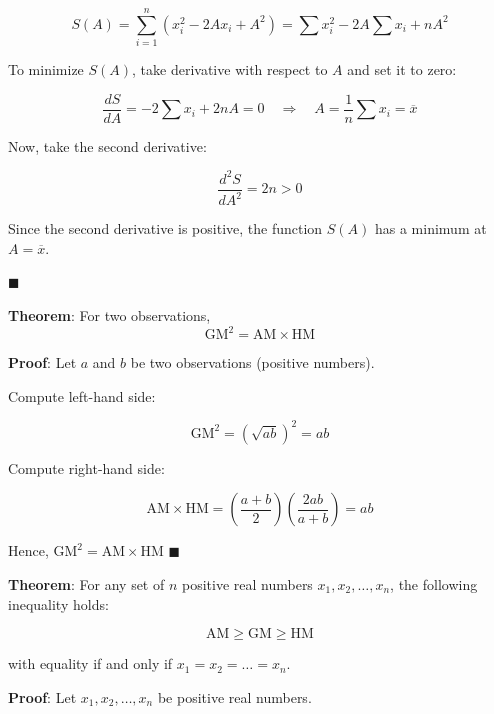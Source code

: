 \documentclass[twoside]{book}
\begin{document}
\[
S(A) = \sum_{i=1}^n (x_i^2 - 2Ax_i + A^2) 
= \sum x_i^2 - 2A\sum x_i + nA^2
\]

To minimize \( S(A) \), take derivative with respect to \( A \) and set it to zero:

\[
\frac{dS}{dA} = -2\sum x_i + 2nA = 0 \quad \Rightarrow \quad A = \frac{1}{n} \sum x_i = \overline{x}
\]

Now, take the second derivative:

\[
\frac{d^2S}{dA^2} = 2n > 0
\]

Since the second derivative is positive, the function \( S(A) \) has a minimum at \( A = \overline{x} \).

\hfill $\blacksquare$

\begin{textbox}
\textbf{Theorem}: For two observations, \[ \text{GM}^2 = \text{AM} \times \text{HM} \]
\end{textbox}

\textbf{Proof}: Let \( a \) and \( b \) be two observations (positive numbers).

Compute left-hand side:

\[
\text{GM}^2 = (\sqrt{ab})^2 = ab
\]

Compute right-hand side:

\[
\text{AM} \times \text{HM} = \left( \frac{a + b}{2} \right) \left( \frac{2ab}{a + b} \right) = ab
\]

Hence, \( \text{GM}^2 = \text{AM} \times \text{HM} \)
\hfill $\blacksquare$

\begin{textbox}
\textbf{Theorem}: For any set of \( n \) positive real numbers \( x_1, x_2, \dots, x_n \), the following inequality holds:

\[
\text{AM} \geq \text{GM} \geq \text{HM}
\]

with equality if and only if \( x_1 = x_2 = \dots = x_n \).
\end{textbox}

\textbf{Proof}: Let \( x_1, x_2, \dots, x_n \) be positive real numbers.
\end{document}
